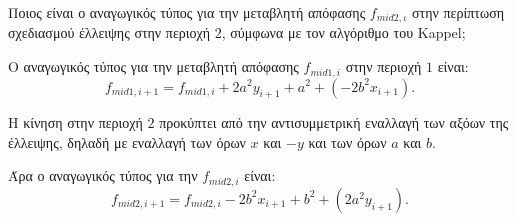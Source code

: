 \begin{exercise}
	
Ποιος είναι ο αναγωγικός τύπος για την μεταβλητή απόφασης $f_{mid2,ι}$ στην περίπτωση σχεδιασμού έλλειψης στην περιοχή $2$, σύμφωνα με τον αλγόριθμο του Kappel;
\end{exercise}

\begin{solution}

Ο αναγωγικός τύπος για την μεταβλητή απόφασης $f_{mid1, i}$ στην περιοχή $1$ είναι:
\[
f_{mid1, i+1} = f_{mid1,i} + 2a^2y_{i+1} + a^2 +(- 2b^2 x_{i+1}).
\]

Η κίνηση στην περιοχή $2$ προκύπτει από την αντισυμμετρική εναλλαγή των αξόων της έλλειψης, δηλαδή με εναλλαγή των όρων $x$ και $-y$ και των όρων $a$ και $b$. 

Άρα ο αναγωγικός τύπος για την $f_{mid2, i}$ είναι:
\[
f_{mid2,i+1} = f_{mid2,i} - 2b^2 x_{i+1} + b^2 + (2a^ 2y_{i+1}).
\]

\end{solution}


